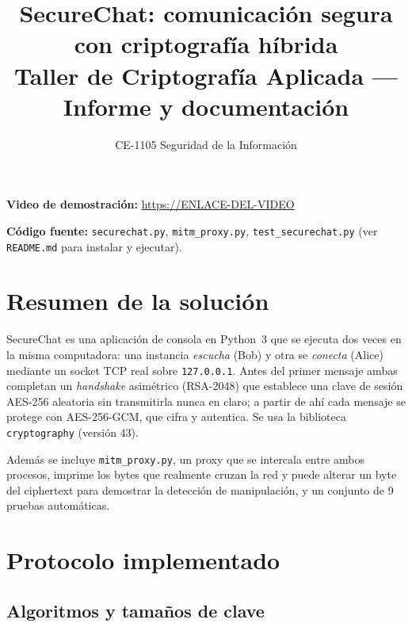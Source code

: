 \documentclass[11pt,a4paper]{article}
\title{\textbf{SecureChat: comunicación segura con criptografía híbrida}\\\large Taller de Criptografía Aplicada --- Informe y documentación}
\author{\estudiantes}
\date{CE-1105 Seguridad de la Información \quad \fechaentrega}
\newcommand{\enlacevideo}{\url{https://ENLACE-DEL-VIDEO}}
\begin{document}
\maketitle
\tableofcontents
\bigskip

\noindent\textbf{Video de demostración:} \enlacevideo

\noindent\textbf{Código fuente:} \texttt{securechat.py}, \texttt{mitm\_proxy.py},
\texttt{test\_securechat.py} (ver \texttt{README.md} para instalar y ejecutar).

\section{Resumen de la solución}

SecureChat es una aplicación de consola en Python~3 que se ejecuta dos veces en la misma
computadora: una instancia \emph{escucha} (Bob) y otra se \emph{conecta} (Alice) mediante un
socket TCP real sobre \texttt{127.0.0.1}. Antes del primer mensaje ambas completan un
\emph{handshake} asimétrico (RSA-2048) que establece una clave de sesión AES-256 aleatoria sin
transmitirla nunca en claro; a partir de ahí cada mensaje se protege con AES-256-GCM, que cifra
y autentica. Se usa la biblioteca \texttt{cryptography} (versión 43).

Además se incluye \texttt{mitm\_proxy.py}, un proxy que se intercala entre ambos procesos,
imprime los bytes que realmente cruzan la red y puede alterar un byte del ciphertext para
demostrar la detección de manipulación, y un conjunto de 9 pruebas automáticas.

\section{Protocolo implementado}

\subsection{Algoritmos y tamaños de clave}
\end{document}
